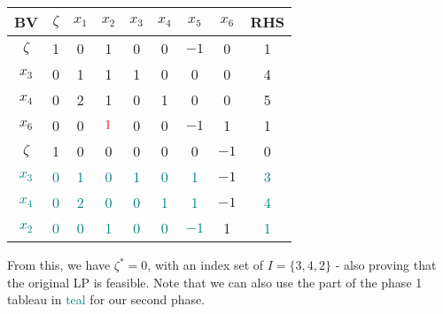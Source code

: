 \documentclass[a4paper, 12pt]{article}
\newcommand{\red}[1]{\textcolor{red}{#1}}
\newcommand{\teal}[1]{\textcolor{teal}{#1}}
\begin{document}
                \begin{center}
                    \begin{tabular}{c|ccccccc|c}
                        BV & $\zeta$ & $x_1$ & $x_2$ & $x_3$ & $x_4$ & $x_5$ & $x_6$ & RHS \\
                        \hline
                        $\zeta$ & 1 & 0 & 1 & 0 & 0 & $-1$ & 0 & 1 \\
                        $x_3$ & 0 & 1 & 1 & 1 & 0 & 0 & 0 & 4 \\
                        $x_4$ & 0 & 2 & 1 & 0 & 1 & 0 & 0 & 5 \\
                        $x_6$ & 0 & 0 & $\red{1}$ & 0 & 0 & $-1$ & 1 & 1 \\
                        \hline
                        $\zeta$ & 1 & 0 & 0 & 0 & 0 & 0 & $-1$ & 0 \\
                        \teal{$x_3$} & \teal{0} & \teal{1} & \teal{0} & \teal{1} & \teal{0} & \teal{1} & $-1$ & \teal{3} \\
                        \teal{$x_4$} & \teal{0} & \teal{2} & \teal{0} & \teal{0} & \teal{1} & \teal{1} & $-1$ & \teal{4} \\
                        \teal{$x_2$} & \teal{0} & \teal{0} & \teal{1} & \teal{0} & \teal{0} & \teal{$-1$} & 1 & \teal{1}
                    \end{tabular}
                \end{center}
                From this, we have $\zeta^* = 0$, with an index set of $I = \{3, 4, 2\}$ - also proving that the original LP is feasible.
                Note that we can also use the part of the phase 1 tableau in \teal{teal} for our second phase.
\end{document}
